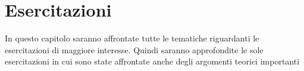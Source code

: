 \chapter{Esercitazioni}
In questo capitolo saranno affrontate tutte le tematiche riguardanti le esercitazioni di maggiore interesse. Quindi saranno approfondite le sole esercitazioni in cui sono state affrontate anche degli argomenti teorici importanti



